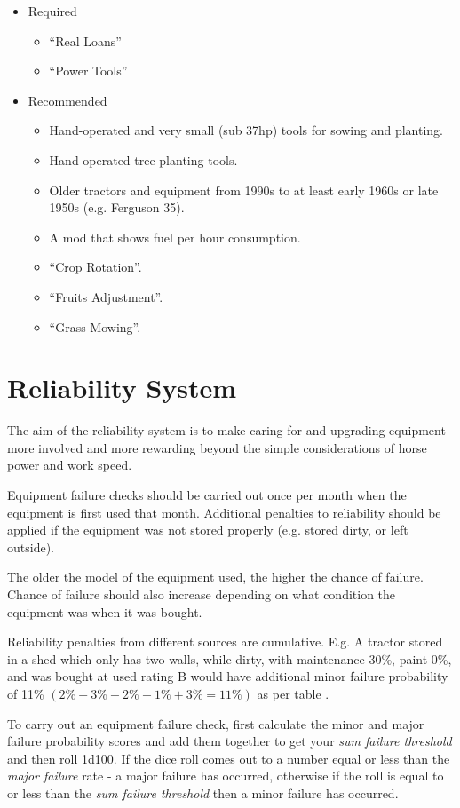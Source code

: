 \documentclass[a4paper,10pt]{article}
\begin{document}
\begin{itemize}
\item Required
  \begin{itemize}
  \item ``Real Loans''
  \item ``Power Tools''
  \end{itemize}
\item Recommended
  \begin{itemize}
    \item Hand-operated and very small (sub 37hp) tools for sowing and planting.
    \item Hand-operated tree planting tools.
    \item Older tractors and equipment from 1990s to at least early 1960s or
      late 1950s (e.g.  Ferguson 35).
    \item A mod that shows fuel per hour consumption.
    \item ``Crop Rotation''.
    \item ``Fruits Adjustment''.
    \item ``Grass Mowing''.
  \end{itemize}
\end{itemize}


\section{Reliability System}
The aim of the reliability system is to make caring for and upgrading equipment
more involved and more rewarding beyond the simple considerations of horse power
and work speed.

Equipment failure checks should be carried out once per month when the equipment
is first used that month. Additional penalties to reliability should be applied
if the equipment was not stored properly (e.g. stored dirty, or left outside).

The older the model of the equipment used, the higher the chance of failure.
Chance of failure should also increase depending on what condition the equipment
was when it was bought.

Reliability penalties from different sources are cumulative. E.g. A tractor
stored in a shed which only has two walls, while dirty, with maintenance 30\%,
paint 0\%, and was bought at used rating B would have additional minor failure
probability of 11\% $(2\% + 3\% + 2\% + 1\% + 3\% = 11\%)$ as per table
.

To carry out an equipment failure check, first calculate the minor and major
failure probability scores and add them together to get your \textit{sum failure
  threshold} and then roll 1d100. If the dice roll comes out to a number equal
or less than the \textit{major failure} rate - a major failure has occurred,
otherwise if the roll is equal to or less than the \textit{sum failure
  threshold} then a minor failure has occurred.
\end{document}
